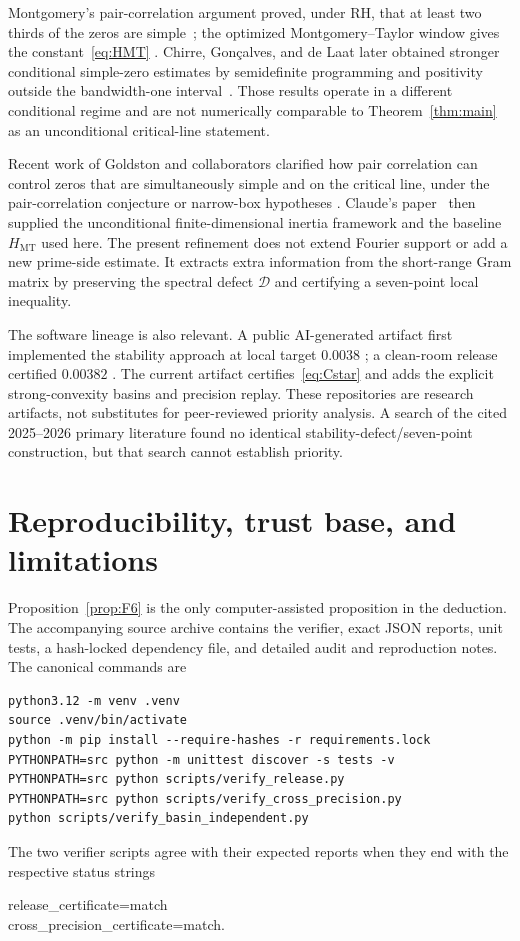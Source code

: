 \documentclass[11pt]{article}
\newcommand{\cD}{\mathcal D}
\newcommand{\MT}{\mathrm{MT}}
\begin{document}
Montgomery's pair-correlation argument proved, under RH, that at least two
thirds of the zeros are simple~\cite{Montgomery73}; the optimized
Montgomery--Taylor window gives the constant~\eqref{eq:HMT}
\cite{Montgomery75}.  Chirre, Gon\c{c}alves, and de Laat later obtained
stronger conditional simple-zero estimates by semidefinite programming and
positivity outside the bandwidth-one interval~\cite{CGdL20}.  Those results
operate in a different conditional regime and are not numerically comparable
to Theorem~\ref{thm:main} as an unconditional critical-line statement.

Recent work of Goldston and collaborators clarified how pair correlation can
control zeros that are simultaneously simple and on the critical line, under
the pair-correlation conjecture or narrow-box hypotheses
\cite{GLSS25,GS25,GS26}.  Claude's paper~\cite{Claude26} then supplied the
unconditional finite-dimensional inertia framework and the baseline
$H_{\MT}$ used here.  The present refinement does not extend Fourier support
or add a new prime-side estimate.  It extracts extra information from the
short-range Gram matrix by preserving the spectral defect $\cD$ and
certifying a seven-point local inequality.

The software lineage is also relevant.  A public AI-generated artifact first
implemented the stability approach at local target $0.0038$
\cite{Ainta26}; a clean-room release certified $0.00382$
\cite{Rademacher26}.  The current artifact certifies~\eqref{eq:Cstar} and adds
the explicit strong-convexity basins and precision replay.  These repositories
are research artifacts, not substitutes for peer-reviewed priority analysis.
A search of the cited 2025--2026 primary literature found no identical
stability-defect/seven-point construction, but that search cannot establish
priority.

\section{Reproducibility, trust base, and limitations}
\label{sec:reproducibility}

Proposition~\ref{prop:F6} is the only computer-assisted proposition in the
deduction.  The accompanying source archive contains the verifier, exact JSON
reports, unit tests, a hash-locked dependency file, and detailed audit and
reproduction notes.  The canonical commands are
\begin{verbatim}
python3.12 -m venv .venv
source .venv/bin/activate
python -m pip install --require-hashes -r requirements.lock
PYTHONPATH=src python -m unittest discover -s tests -v
PYTHONPATH=src python scripts/verify_release.py
PYTHONPATH=src python scripts/verify_cross_precision.py
python scripts/verify_basin_independent.py
\end{verbatim}
The two verifier scripts agree with their expected reports when they end with
the respective status strings
\begin{center}
\small\ttfamily
release\_certificate=match\\[2pt]
cross\_precision\_certificate=match.
\end{center}
\end{document}
